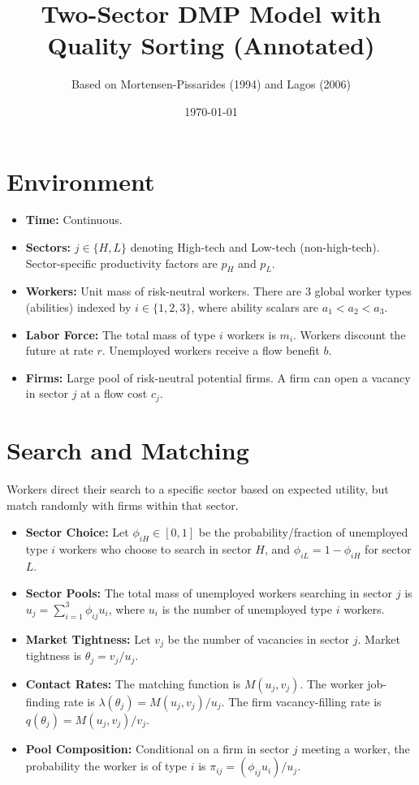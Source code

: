 \documentclass[11pt]{article}
\title{Two-Sector DMP Model with Quality Sorting (Annotated)}
\author{Based on Mortensen-Pissarides (1994) and Lagos (2006)}
\date{\today}
\begin{document}
\maketitle

\section{Environment}
\begin{itemize}
    \item \textbf{Time:} Continuous.
    \item \textbf{Sectors:} $j \in \{H, L\}$ denoting High-tech and Low-tech (non-high-tech). Sector-specific productivity factors are $p_H$ and $p_L$.
    \item \textbf{Workers:} Unit mass of risk-neutral workers. There are 3 global worker types (abilities) indexed by $i \in \{1, 2, 3\}$, where ability scalars are $a_1 < a_2 < a_3$.
    \item \textbf{Labor Force:} The total mass of type $i$ workers is $m_i$. Workers discount the future at rate $r$. Unemployed workers receive a flow benefit $b$.
    \item \textbf{Firms:} Large pool of risk-neutral potential firms. A firm can open a vacancy in sector $j$ at a flow cost $c_j$.
\end{itemize}

\section{Search and Matching}
Workers direct their search to a specific sector based on expected utility, but match randomly with firms within that sector.
\begin{itemize}
    \item \textbf{Sector Choice:} Let $\phi_{iH} \in [0, 1]$ be the probability/fraction of unemployed type $i$ workers who choose to search in sector $H$, and $\phi_{iL} = 1 - \phi_{iH}$ for sector $L$.
    \item \textbf{Sector Pools:} The total mass of unemployed workers searching in sector $j$ is $u_j = \sum_{i=1}^3 \phi_{ij} u_i$, where $u_i$ is the number of unemployed type $i$ workers.
    \item \textbf{Market Tightness:} Let $v_j$ be the number of vacancies in sector $j$. Market tightness is $\theta_j = v_j / u_j$.
    \item \textbf{Contact Rates:} The matching function is $M(u_j, v_j)$. The worker job-finding rate is $\lambda(\theta_j) = M(u_j, v_j) / u_j$. The firm vacancy-filling rate is $q(\theta_j) = M(u_j, v_j) / v_j$.
    \item \textbf{Pool Composition:} Conditional on a firm in sector $j$ meeting a worker, the probability the worker is of type $i$ is $\pi_{ij} = (\phi_{ij} u_i) / u_j$.
\end{itemize}
\end{document}
